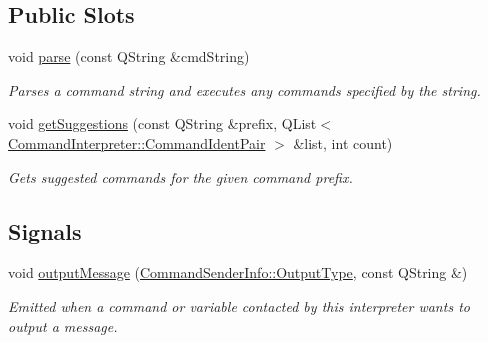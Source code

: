 \subsection*{Public Slots}
\begin{DoxyCompactItemize}
\item 
void \hyperlink{class_command_interpreter_a4e89cb4ce6338493f8d2b14420266946}{parse} (const Q\-String \&cmd\-String)
\begin{DoxyCompactList}\small\item\em Parses a command string and executes any commands specified by the string. \end{DoxyCompactList}\item 
void \hyperlink{class_command_interpreter_a1733b57b9ecbc50e849b026d49628b7c}{get\-Suggestions} (const Q\-String \&prefix, Q\-List$<$ \hyperlink{class_command_interpreter_acef7360cdc3e98c4d35ec54954c4e39c}{Command\-Interpreter\-::\-Command\-Ident\-Pair} $>$ \&list, int count)
\begin{DoxyCompactList}\small\item\em Gets suggested commands for the given command prefix. \end{DoxyCompactList}\end{DoxyCompactItemize}
\subsection*{Signals}
\begin{DoxyCompactItemize}
\item 
\hypertarget{class_command_interpreter_a75b578397ec1804ae57a81fde9e757ec}{void \hyperlink{class_command_interpreter_a75b578397ec1804ae57a81fde9e757ec}{output\-Message} (\hyperlink{class_command_sender_info_a3a5e6a2ef1772f6557f351652c2e3b60}{Command\-Sender\-Info\-::\-Output\-Type}, const Q\-String \&)}\label{class_command_interpreter_a75b578397ec1804ae57a81fde9e757ec}

\begin{DoxyCompactList}\small\item\em Emitted when a command or variable contacted by this interpreter wants to output a message. \end{DoxyCompactList}\end{DoxyCompactItemize}

